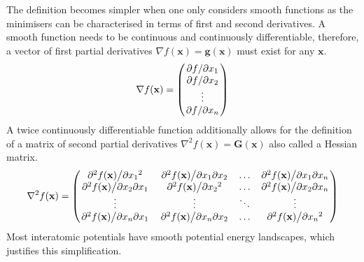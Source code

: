 The definition becomes simpler when one only considers smooth functions as the
minimisers can be characterised in terms of first and second derivatives. A
smooth function needs to be continuous and continuously differentiable,
therefore, a vector of first partial derivatives $\nabla
f(\mathbf{x})=\mathbf{g}(\mathbf{x})$ must exist for any $\mathbf{x}$.
%
\begin{equation}
    \nabla f(\mathbf{x})=
    \begin{pmatrix}
        \pdv*{f}{x_1}\\
        \pdv*{f}{x_2}\\
        \vdots\\
        \pdv*{f}{x_n}
    \end{pmatrix}
\end{equation}
%
A twice continuously differentiable function additionally allows for the
definition of a matrix of second partial derivatives $\nabla^2
f(\mathbf{x})=\mathbf{G}(\mathbf{x})$ also called a Hessian matrix.
%
\begin{equation}
    \nabla^2 f(\mathbf{x})=
    \begin{pmatrix}
        \pdv*[2]{f(\mathbf{x})}{{x_1}} & \pdv*{f(\mathbf{x})}{x_1}{x_2} & \ldots & \pdv*{f(\mathbf{x})}{x_1}{x_{n}}\\
        \pdv*{f(\mathbf{x})}{x_2}{x_1} & \pdv*[2]{f(\mathbf{x})}{{x_2}} & \ldots & \pdv*{f(\mathbf{x})}{x_2}{x_{n}}\\
        \vdots & \vdots & \ddots & \vdots\\
        \pdv*{f(\mathbf{x})}{x_{n}}{x_1} & \pdv*{f(\mathbf{x})}{x_{n}}{x_2} & \ldots & \pdv*[2]{f(\mathbf{x})}{{x_{n}}}
    \end{pmatrix}
\end{equation}
%
Most interatomic potentials have smooth potential energy landscapes, which
justifies this simplification. 


